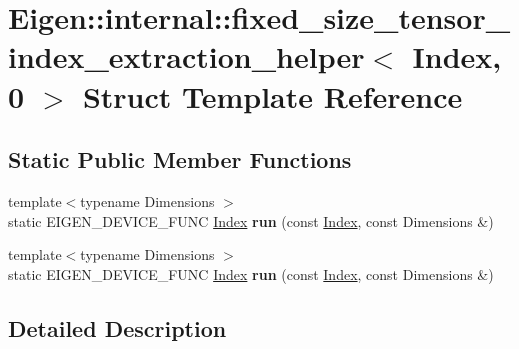 \hypertarget{struct_eigen_1_1internal_1_1fixed__size__tensor__index__extraction__helper_3_01_index_00_010_01_4}{}\section{Eigen\+:\+:internal\+:\+:fixed\+\_\+size\+\_\+tensor\+\_\+index\+\_\+extraction\+\_\+helper$<$ Index, 0 $>$ Struct Template Reference}
\label{struct_eigen_1_1internal_1_1fixed__size__tensor__index__extraction__helper_3_01_index_00_010_01_4}
\subsection*{Static Public Member Functions}
\begin{DoxyCompactItemize}
\item 
\mbox{\label{struct_eigen_1_1internal_1_1fixed__size__tensor__index__extraction__helper_3_01_index_00_010_01_4_a57460c0fb724fdac2a386fdf0c597b94}} 
{\footnotesize template$<$typename Dimensions $>$ }\\static E\+I\+G\+E\+N\+\_\+\+D\+E\+V\+I\+C\+E\+\_\+\+F\+U\+NC \hyperlink{namespace_eigen_a62e77e0933482dafde8fe197d9a2cfde}{Index} {\bfseries run} (const \hyperlink{namespace_eigen_a62e77e0933482dafde8fe197d9a2cfde}{Index}, const Dimensions \&)
\item 
\mbox{\label{struct_eigen_1_1internal_1_1fixed__size__tensor__index__extraction__helper_3_01_index_00_010_01_4_a57460c0fb724fdac2a386fdf0c597b94}} 
{\footnotesize template$<$typename Dimensions $>$ }\\static E\+I\+G\+E\+N\+\_\+\+D\+E\+V\+I\+C\+E\+\_\+\+F\+U\+NC \hyperlink{namespace_eigen_a62e77e0933482dafde8fe197d9a2cfde}{Index} {\bfseries run} (const \hyperlink{namespace_eigen_a62e77e0933482dafde8fe197d9a2cfde}{Index}, const Dimensions \&)
\end{DoxyCompactItemize}


\subsection{Detailed Description}
